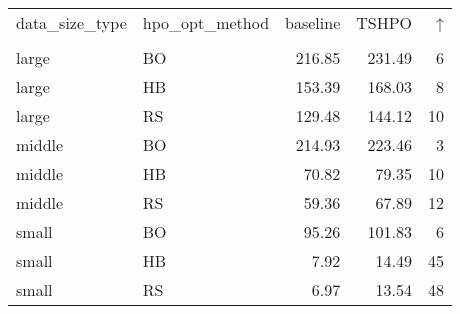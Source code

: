 \begin{tabular}{llrrr}
\toprule
data\_size\_type & hpo\_opt\_method & baseline &  TSHPO &  ↑ \\
               \\
\midrule
         large &             BO &   216.85 & 231.49 &  6 \\
         large &             HB &   153.39 & 168.03 &  8 \\
         large &             RS &   129.48 & 144.12 & 10 \\
        middle &             BO &   214.93 & 223.46 &  3 \\
        middle &             HB &    70.82 &  79.35 & 10 \\
        middle &             RS &    59.36 &  67.89 & 12 \\
         small &             BO &    95.26 & 101.83 &  6 \\
         small &             HB &     7.92 &  14.49 & 45 \\
         small &             RS &     6.97 &  13.54 & 48 \\
\bottomrule
\end{tabular}
